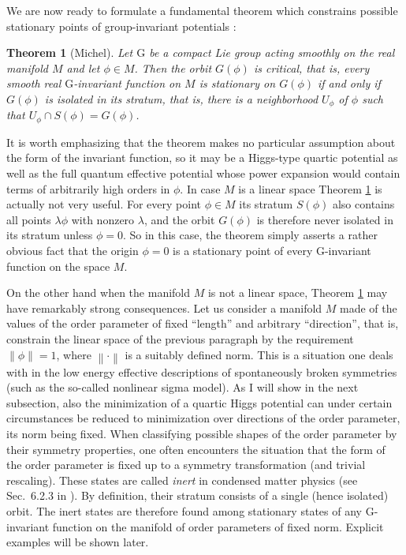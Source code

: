 \documentclass[final,3p,times,12pt,a4paper,sort&compress]{elsarticle}
\newcommand\gr[1]{\mathrm{#1}}              %
\newcommand\thname{Theorem}
\newtheorem{theorem}{\thname}
\newcommand\nor[1]{\left\|#1\right\|}       %
\begin{document}
We are now ready to formulate a fundamental theorem which constrains possible
stationary points of group-invariant potentials \cite{Michel:1971th}:
\begin{theorem}[Michel]
\label{thm:michel1}
Let $\gr G$ be a compact Lie group acting smoothly on the real manifold $M$ and
let $\phi\in M$. Then the orbit $G(\phi)$ is critical, that is, \emph{every
smooth real $\gr G$-invariant function on $M$ is stationary on $G(\phi)$ if and
only if $G(\phi)$ is isolated in its stratum}, that is, there is a neighborhood
$U_\phi$ of $\phi$ such that $U_\phi\cap S(\phi)=G(\phi)$.
\end{theorem}
It is worth emphasizing that the theorem makes no particular assumption about
the form of the invariant function, so it may be a Higgs-type quartic
potential as well as the full quantum effective potential whose power expansion
would contain terms of arbitrarily high orders in $\phi$. In case $M$ is a
linear space Theorem \ref{thm:michel1} is actually not very useful. For every
point $\phi\in M$ its stratum $S(\phi)$ also contains all points $\lambda\phi$
with nonzero $\lambda$, and the orbit $G(\phi)$ is therefore never isolated in
its stratum unless $\phi=0$. So in this case, the theorem simply asserts a
rather obvious fact that the origin $\phi=0$ is a stationary point of every $\gr
G$-invariant function on the space $M$.

On the other hand when the manifold $M$ is not a linear space, Theorem
\ref{thm:michel1} may have remarkably strong consequences. Let us consider a
manifold $M$ made of the values of the order parameter of fixed ``length'' and
arbitrary ``direction'', that is, constrain the linear space of the previous
paragraph by the requirement $\nor\phi=1$, where $\nor\cdot$ is a suitably
defined norm. This is a situation one deals with in the low energy effective
descriptions of spontaneously broken symmetries (such as the so-called nonlinear
sigma model). As I will show in the next subsection, also the minimization of a
quartic Higgs potential can under certain circumstances be reduced to
minimization over directions of the order parameter, its norm being fixed. When
classifying possible shapes of the order parameter by their symmetry properties,
one often encounters the situation that the form of the order parameter is fixed
up to a symmetry transformation (and trivial rescaling). These states are called
\emph{inert} in condensed matter physics (see Sec.~6.2.3 in
\cite{Vollhardt:1990vw}). By definition, their stratum consists of a single
(hence isolated) orbit. The inert states are therefore found among stationary
states of any $\gr G$-invariant function on the manifold of order parameters of
fixed norm. Explicit examples will be shown later.
\end{document}
